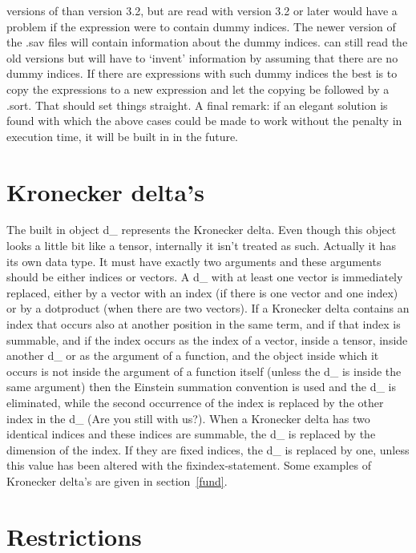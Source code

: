 versions of {\FORM} than version 3.2, but are read with version 3.2 or later 
would have a problem if the expression were to contain dummy indices. The 
newer version of the .sav files will contain information 
about the dummy indices. {\FORM} can still read the old versions but will 
have to `invent' information by assuming that there are no dummy indices. 
If there are expressions with such dummy indices the best is to copy the 
expressions to a new expression and let the copying be followed by a .sort. 
That should set things straight. A final remark: if an elegant solution is 
found with which the above cases could be made to work without the penalty 
in execution time, it will be built in in the future.

\section{Kronecker delta's}

\label{sect-kroneckerdelta}
The built in object d\_ represents the Kronecker 
delta. Even though this 
object looks a little bit like a tensor, internally it isn't treated as 
such. Actually it has its own data type. It must have exactly two arguments 
and these arguments should be either indices or vectors. A d\_ with at 
least one vector is immediately replaced, either by a vector with an index 
(if there is one vector and one index) or by a dotproduct (when there are 
two vectors). If a Kronecker delta contains an index that occurs also at 
another position in the same term, and if that index is summable, and if 
the index occurs as the index of a vector, inside a tensor, inside another 
d\_ or as the argument of a function, and the object inside which it occurs 
is not inside the argument of a function itself (unless the d\_ is inside 
the same argument) then the Einstein 
summation convention is used and the 
d\_ is eliminated, while the second occurrence of the index is replaced by 
the other index in the d\_ (Are you still with us?). When a 
Kronecker delta has two identical indices and these indices are summable, 
the d\_ is replaced by the dimension of the index. If they are fixed 
indices, the d\_ is replaced by one, unless this value has been altered 
with the fixindex-statement. Some examples of Kronecker delta's are given 
in section~\ref{fund}.

\section{Restrictions}

